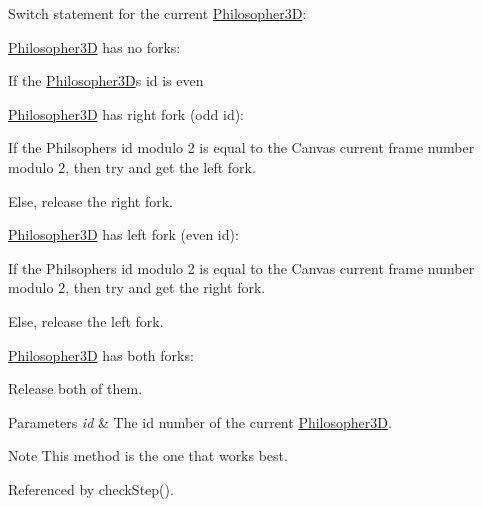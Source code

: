 \begin{DoxyItemize}
\item Switch statement for the current \hyperlink{class_philosopher3_d}{Philosopher3D}\+:
\begin{DoxyItemize}
\item \hyperlink{class_philosopher3_d}{Philosopher3D} has no forks\+:
\begin{DoxyItemize}
\item If the \hyperlink{class_philosopher3_d}{Philosopher3D}\textquotesingle{}s id is even
\end{DoxyItemize}
\item \hyperlink{class_philosopher3_d}{Philosopher3D} has right fork (odd id)\+:
\begin{DoxyItemize}
\item If the Philsopher\textquotesingle{}s id modulo 2 is equal to the Canvas\textquotesingle{} current frame number modulo 2, then try and get the left fork.
\item Else, release the right fork.
\end{DoxyItemize}
\item \hyperlink{class_philosopher3_d}{Philosopher3D} has left fork (even id)\+:
\begin{DoxyItemize}
\item If the Philsopher\textquotesingle{}s id modulo 2 is equal to the Canvas\textquotesingle{} current frame number modulo 2, then try and get the right fork.
\item Else, release the left fork.
\end{DoxyItemize}
\item \hyperlink{class_philosopher3_d}{Philosopher3D} has both forks\+:
\begin{DoxyItemize}
\item Release both of them.
\end{DoxyItemize}
\end{DoxyItemize}
\end{DoxyItemize}
\begin{DoxyParams}{Parameters}
{\em id} & The id number of the current \hyperlink{class_philosopher3_d}{Philosopher3D}. \\
\hline
\end{DoxyParams}
\begin{DoxyNote}{Note}
This method is the one that works best. 
\end{DoxyNote}


Referenced by check\+Step().

\mbox{\label{class_table3_d_aea2b67e82829dc28c5ba3b098ef7f57f}} 
